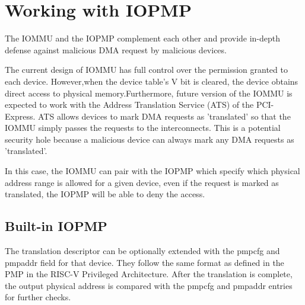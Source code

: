 \section{Working with IOPMP}

The IOMMU and the IOPMP complement each other and provide in-depth defense against
malicious DMA request by malicious devices.

The current design of IOMMU has full control over the permission granted to each device.
However,when the device table's V bit is cleared, the device obtains direct access to
physical memory.Furthermore, future version of the IOMMU is expected to work with the
Address Translation Service (ATS) of the PCI-Express. ATS allows devices to mark DMA
requests as 'translated' so that the IOMMU simply passes the requests to the
interconnects. This is a potential security hole because a malicious device can always
mark any DMA requests as 'translated'.

In this case, the IOMMU can pair with the IOPMP which specify which physical address range
is allowed for a given device, even if the request is marked as translated, the IOPMP will
be able to deny the access.

\subsection{Built-in IOPMP}

The translation descriptor can be optionally extended with the pmpcfg and pmpaddr field
for that device. They follow the same format as defined in the PMP in the RISC-V
Privileged Architecture. After the translation is complete, the output physical address is
compared with the pmpcfg and pmpaddr entries for further checks. 
